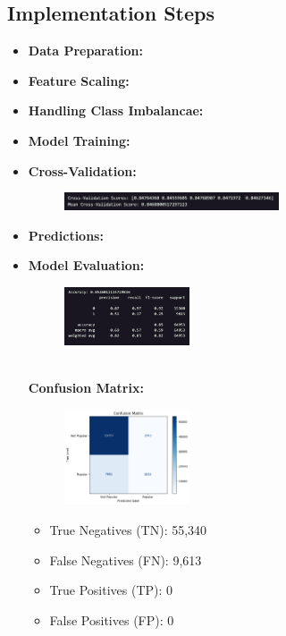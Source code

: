 \subsection{Implementation Steps}
\begin{itemize}
    \item \textbf{Data Preparation: } 
    \item \textbf{Feature Scaling: } 
    \item \textbf{Handling Class Imbalancae: } 
    \item \textbf{Model Training: } 
    \item \textbf{Cross-Validation: } 
        \begin{figure}[h] 
            \centering 
            \includegraphics[width=0.6\textwidth]{media/random_forest_cross_validation.png} 
        \end{figure}
    \item \textbf{Predictions: } 
    \item \textbf{Model Evaluation: } 
        \begin{figure}[h] 
            \centering 
            \includegraphics[width=0.35\textwidth]{media/random_forest_accuracy_numbers.png} 
        \end{figure}
        \\
        \textbf{Confusion Matrix: }
        \begin{figure}[h] 
            \centering 
            \includegraphics[width=0.35\textwidth]{media/random_forest_conf_matrix.png} 
        \end{figure}
        \begin{itemize}
            \item True Negatives (TN): 55,340 
            \item False Negatives (FN): 9,613 
            \item True Positives (TP): 0 
            \item False Positives (FP): 0 
        \end{itemize}
        

\end{itemize}
